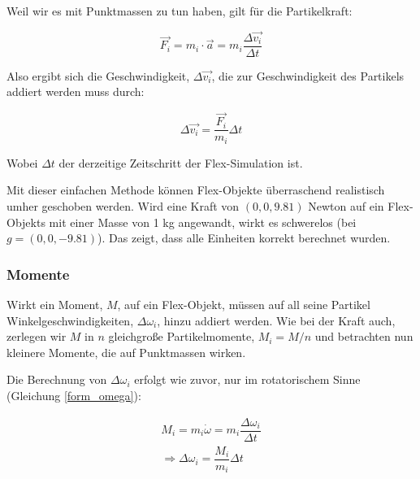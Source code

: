 Weil wir es mit Punktmassen zu tun haben, gilt für die Partikelkraft:

\begin{equation}
\vec{F_i} = m_i \cdot \vec{a} = m_i \dfrac{\Delta \vec{v_i}}{\Delta t}
\label{form_F}
\end{equation}

Also ergibt sich die Geschwindigkeit, $\Delta \vec{v_i}$, die zur Geschwindigkeit des Partikels addiert werden muss durch:

\begin{equation}
\Delta \vec{v_i} = \dfrac{\vec{F_i}}{m_i}\Delta t
\label{form_dv}
\end{equation}

Wobei $\Delta t$ der derzeitige Zeitschritt der Flex-Simulation ist. 


Mit dieser einfachen Methode können Flex-Objekte überraschend realistisch umher geschoben werden. Wird eine Kraft von $(0 , 0 , 9.81 )$ Newton auf ein Flex-Objekts mit einer Masse von 1 kg angewandt, wirkt es schwerelos (bei $g=(0 , 0 , -9.81 )$). Das zeigt, dass alle Einheiten korrekt berechnet wurden.


\subsubsection{Momente}

Wirkt ein Moment, $M$, auf ein Flex-Objekt, müssen auf all seine Partikel Winkelgeschwindigkeiten, $\Delta \omega_i$, hinzu addiert werden. Wie bei der Kraft auch, zerlegen wir $M$ in $n$ gleichgroße Partikelmomente, $M_i=M/n$ und betrachten nun kleinere Momente, die auf Punktmassen wirken.

Die Berechnung von $\Delta \omega_i$ erfolgt wie zuvor, nur im rotatorischem Sinne (Gleichung \ref{form_omega}):

\begin{equation}
\begin{split}
M_i = m_i   \dot{\omega} = m_i \dfrac{\Delta \omega_i}{\Delta t} \\
\Rightarrow  \Delta \omega_i = \dfrac{M_i}{m_i} \Delta t
\end{split}
\label{form_omega}
\end{equation}

